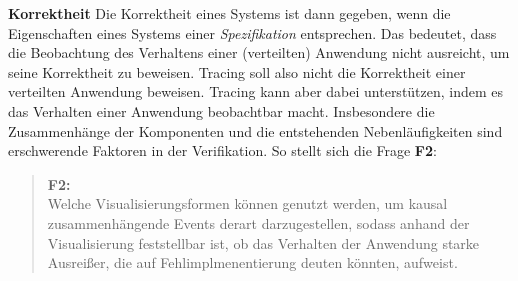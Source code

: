 \textbf{Korrektheit} \space\space\space Die Korrektheit eines Systems ist dann gegeben, wenn die Eigenschaften eines Systems einer \emph{Spezifikation} entsprechen. Das bedeutet, dass die Beobachtung des Verhaltens einer (verteilten) Anwendung nicht ausreicht, um seine Korrektheit zu beweisen. Tracing soll also nicht die Korrektheit einer verteilten Anwendung beweisen. Tracing kann aber dabei unterstützen, indem es das Verhalten einer Anwendung beobachtbar macht. Insbesondere die Zusammenhänge der Komponenten und die entstehenden Nebenläufigkeiten sind erschwerende Faktoren in der Verifikation. So stellt sich die Frage \textbf{F2}:

\begin{quote}
	\cbstart
	\textbf{F2:}\\
	Welche Visualisierungsformen können genutzt werden, um kausal zusammenhängende Events derart darzugestellen, sodass anhand der Visualisierung feststellbar ist, ob das Verhalten der Anwendung starke Ausreißer, die auf Fehlimplmenentierung deuten könnten, aufweist.
	\cbend
\end{quote}

